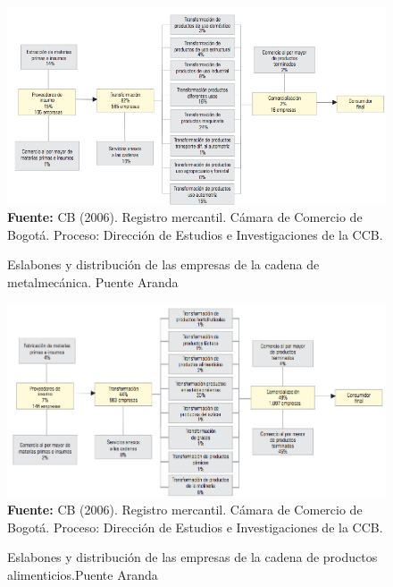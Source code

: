 \documentclass[a4paper,openright,12pt]{book}
\theoremstyle{definition}
\theoremstyle{remark}
\begin{document}
\begin{figure}[!ht]
\centering
\caption{Eslabones y distribución de las empresas de la cadena de metalmecánica. Puente Aranda}
 \includegraphics[scale=0.55]{Puente}
\label{fig:1_OpenSSL}
\\ \textbf{Fuente:} CB (2006). Registro mercantil. Cámara de Comercio de Bogotá. Proceso: Dirección de Estudios e Investigaciones de la CCB.
\end{figure}
\begin{figure}[!ht]
\centering
\caption{Eslabones y distribución de las empresas de la cadena de productos alimenticios.Puente Aranda}
 \includegraphics[scale=0.5]{Puente2}
\label{fig:1_OpenSSL}
\\ \textbf{Fuente:} CB (2006). Registro mercantil. Cámara de Comercio de Bogotá. Proceso: Dirección de Estudios e Investigaciones de la CCB.
\end{figure}
\end{document}
